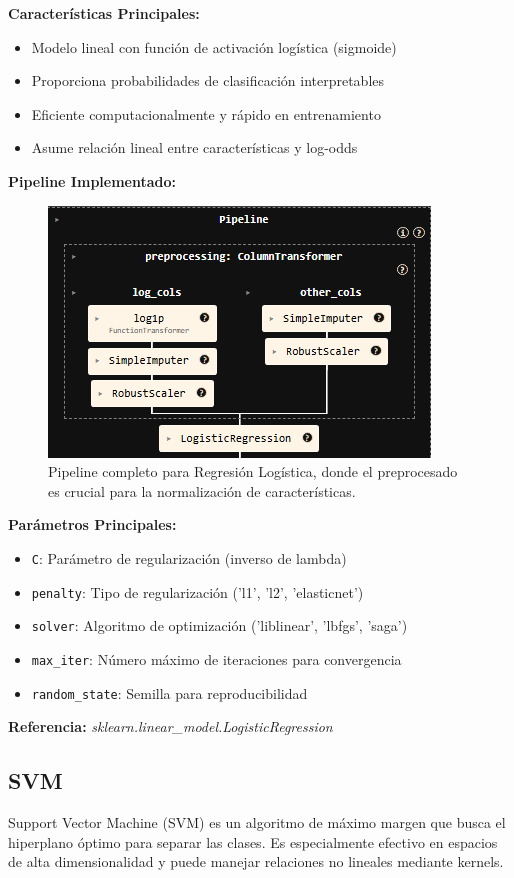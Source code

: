 \documentclass{article}
\begin{document}
\textbf{Características Principales:}
\begin{itemize}
    \item Modelo lineal con función de activación logística (sigmoide)
    \item Proporciona probabilidades de clasificación interpretables
    \item Eficiente computacionalmente y rápido en entrenamiento
    \item Asume relación lineal entre características y log-odds
\end{itemize}

\textbf{Pipeline Implementado:}
\begin{figure}[H]
    \centering
    \includegraphics[width=0.4\linewidth]{pipeline_logistic_regression.png}
    \caption{Pipeline completo para Regresión Logística, donde el preprocesado es crucial para la normalización de características.}
    \label{fig:pipeline_lr}
\end{figure}

\textbf{Parámetros Principales:}
\begin{itemize}
    \item \texttt{C}: Parámetro de regularización (inverso de lambda)
    \item \texttt{penalty}: Tipo de regularización ('l1', 'l2', 'elasticnet')
    \item \texttt{solver}: Algoritmo de optimización ('liblinear', 'lbfgs', 'saga')
    \item \texttt{max\_iter}: Número máximo de iteraciones para convergencia
    \item \texttt{random\_state}: Semilla para reproducibilidad
\end{itemize}

\textbf{Referencia:} \textit{sklearn.linear\_model.LogisticRegression} \cite{sklearn_lr}

\subsection{SVM}

Support Vector Machine (SVM) es un algoritmo de máximo margen que busca el hiperplano óptimo para separar las clases. Es especialmente efectivo en espacios de alta dimensionalidad y puede manejar relaciones no lineales mediante kernels.
\end{document}
